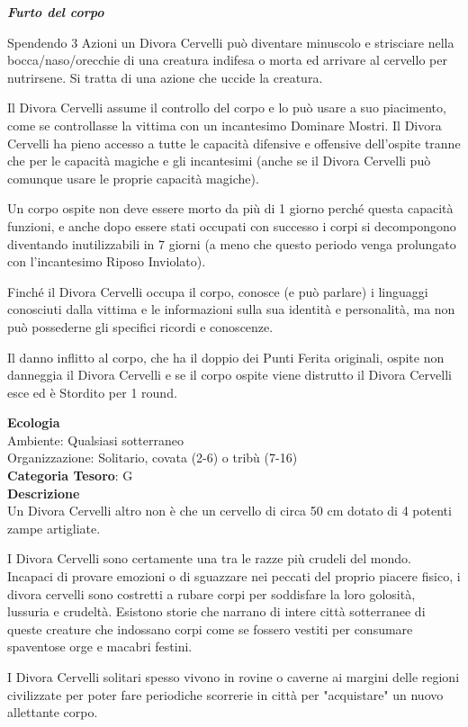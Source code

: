 \begin{multicols}{2}
{\emph{\textbf{Furto del corpo}}

Spendendo 3 Azioni un Divora Cervelli può diventare minuscolo e strisciare nella bocca/naso/orecchie di una creatura indifesa o morta ed arrivare al cervello per nutrirsene. Si tratta di una azione che uccide la creatura.

Il Divora Cervelli assume il controllo del corpo e lo può usare a suo piacimento, come se controllasse la vittima con un incantesimo Dominare Mostri. Il Divora Cervelli ha pieno accesso a tutte le capacità difensive e offensive dell'ospite tranne che per le capacità magiche e gli incantesimi (anche se il Divora Cervelli può comunque usare le proprie capacità magiche).

Un corpo ospite non deve essere morto da più di 1 giorno perché questa capacità funzioni, e anche dopo essere stati occupati con successo i corpi si decompongono diventando inutilizzabili in 7 giorni (a meno che questo periodo venga prolungato con l'incantesimo Riposo Inviolato).

Finché il Divora Cervelli occupa il corpo, conosce (e può parlare) i linguaggi conosciuti dalla vittima e le informazioni sulla sua identità e personalità, ma non può possederne gli specifici ricordi e conoscenze.

Il danno inflitto al corpo, che ha il doppio dei Punti Ferita originali, ospite non danneggia il Divora Cervelli e se il corpo ospite viene distrutto il Divora Cervelli esce ed è Stordito per 1 round.

\textbf{Ecologia}\\
Ambiente: Qualsiasi sotterraneo\\
Organizzazione: Solitario, covata (2-6) o tribù (7-16)\\
\textbf{Categoria Tesoro}: G\\
\textbf{Descrizione}\\
Un Divora Cervelli altro non è che un cervello di circa 50 cm dotato di 4 potenti zampe artigliate.

I Divora Cervelli sono certamente una tra le razze più crudeli del mondo. Incapaci di provare emozioni o di sguazzare nei peccati del proprio piacere fisico, i divora cervelli sono costretti a rubare corpi per soddisfare la loro golosità, lussuria e crudeltà. Esistono storie che narrano di intere città sotterranee di queste creature che indossano corpi come se fossero vestiti per consumare spaventose orge e macabri festini.

I Divora Cervelli solitari spesso vivono in rovine o caverne ai margini delle regioni civilizzate per poter fare periodiche scorrerie in città per "acquistare" un nuovo allettante corpo.

}
\end{multicols}
